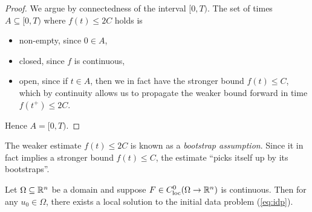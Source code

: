\begin{proof}
	We argue by connectedness of the interval $[0, T)$. The set of times $A \subseteq [0, T)$ where $f(t) \leq 2C$ holds is
		\begin{itemize}
			\item non-empty, since $0 \in A$, 
			\item closed, since $f$ is continuous, 
			\item open, since if $t \in A$, then we in fact have the stronger bound $f(t) \leq C$, which by continuity allows us to propagate the weaker bound forward in time $f(t^+) \leq 2C$. 
		\end{itemize}
	Hence $A = [0, T)$. 
\end{proof}

\begin{remark}
	The weaker estimate $f(t) \leq 2C$ is known as a \emph{bootstrap assumption}. Since it in fact implies a stronger bound $f(t) \leq C$, the estimate ``picks itself up by its bootstraps''. 
\end{remark}

\begin{theorem}
	Let $\Omega \subseteq \mathbb R^n$ be a domain and suppose $F \in C^0_{\mathrm{loc}} (\Omega \to \mathbb R^n)$ is continuous. Then for any $u_0 \in \Omega$, there exists a local solution to the initial data problem (\ref{eq:idp}).
\end{theorem}

